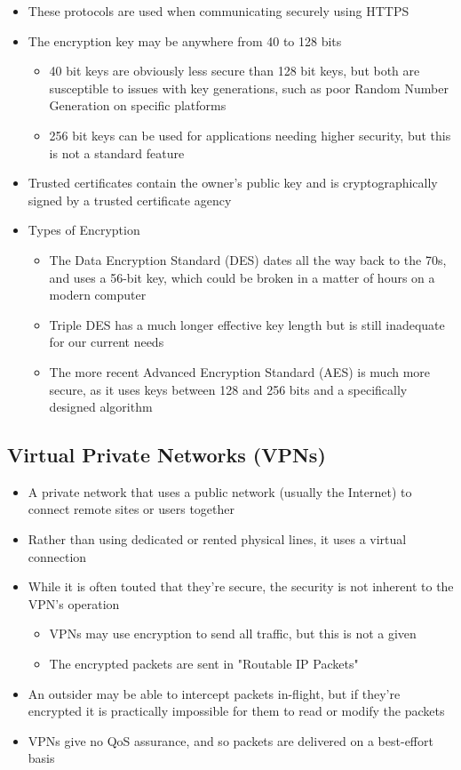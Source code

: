 \begin{itemize}
  \item These protocols are used when communicating securely using HTTPS
  \item The encryption key may be anywhere from 40 to 128 bits
  \begin{itemize}
    \item 40 bit keys are obviously less secure than 128 bit keys, but both are susceptible to issues with key generations, such as poor Random Number Generation on specific platforms
    \item 256 bit keys can be used for applications needing higher security, but this is not a standard feature
  \end{itemize}
  \item Trusted certificates contain the owner's public key and is cryptographically signed by a trusted certificate agency
  \item Types of Encryption
  \begin{itemize}
    \item The Data Encryption Standard (DES) dates all the way back to the 70s, and uses a 56-bit key, which could be broken in a matter of hours on a modern computer
    \item Triple DES has a much longer effective key length but is still inadequate for our current needs
    \item The more recent Advanced Encryption Standard (AES) is much more secure, as it uses keys between 128 and 256 bits and a specifically designed algorithm
  \end{itemize}
\end{itemize}

\subsection*{Virtual Private Networks (VPNs)}

\begin{itemize}
  \item A private network that uses a public network (usually the Internet) to connect remote sites or users together
  \item Rather than using dedicated or rented physical lines, it uses a virtual connection
  \item While it is often touted that they're secure, the security is not inherent to the VPN's operation
  \begin{itemize}
    \item VPNs may use encryption to send all traffic, but this is not a given
    \item The encrypted packets are sent in "Routable IP Packets"
  \end{itemize}
  \item An outsider may be able to intercept packets in-flight, but if they're encrypted it is practically impossible for them to read or modify the packets
  \item VPNs give no QoS assurance, and so packets are delivered on a best-effort basis
\end{itemize}


